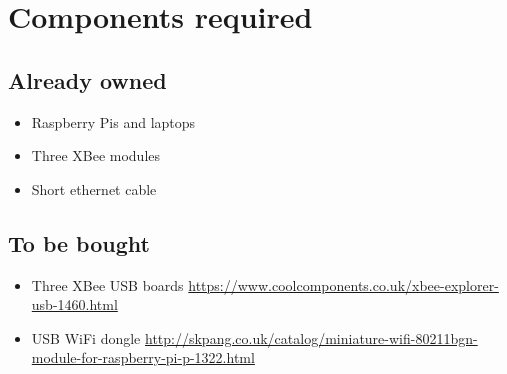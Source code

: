 \documentclass[a4paper,12pt]{article}
\begin{document}
\section{Components required}

\subsection{Already owned}

\begin{itemize}
  \item Raspberry Pis and laptops
  \item Three XBee modules
  \item Short ethernet cable
\end{itemize}

\subsection{To be bought}

\begin{itemize}
  \item Three XBee USB boards \url{https://www.coolcomponents.co.uk/xbee-explorer-usb-1460.html}
  \item USB WiFi dongle \url{http://skpang.co.uk/catalog/miniature-wifi-80211bgn-module-for-raspberry-pi-p-1322.html}
\end{itemize}
\end{document}
